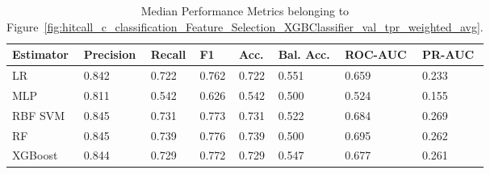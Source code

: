 \begin{longtable}{llllllll}
\caption{Median Performance Metrics belonging to Figure~\ref{fig:hitcall_c_classification_Feature_Selection_XGBClassifier_val_tpr_weighted_avg}.}\label{tab:table:hitcall_c_classification_feature_selection_xgbclassifier_val_tpr_weighted_avg}\\
\toprule
\midrule
\small Estimator & \small Precision & \small Recall & \small F1 & \small Acc. & \small Bal. Acc. & \small ROC-AUC & \small PR-AUC\\
\hline
LR & 0.842 & 0.722 & 0.762 & 0.722 & 0.551 & 0.659 & 0.233\\
MLP & 0.811 & 0.542 & 0.626 & 0.542 & 0.500 & 0.524 & 0.155\\
RBF SVM & 0.845 & 0.731 & 0.773 & 0.731 & 0.522 & 0.684 & 0.269\\
RF & 0.845 & 0.739 & 0.776 & 0.739 & 0.500 & 0.695 & 0.262\\
XGBoost & 0.844 & 0.729 & 0.772 & 0.729 & 0.547 & 0.677 & 0.261\\
\bottomrule
\end{longtable}